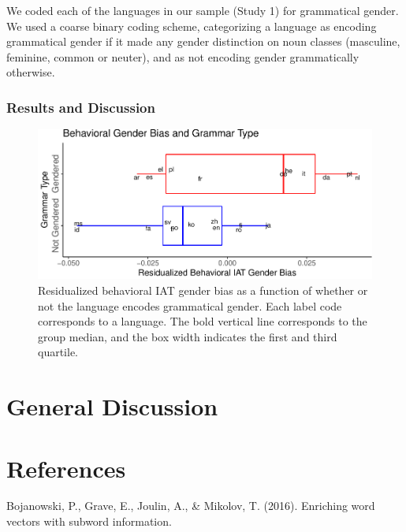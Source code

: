 \documentclass[man,floatsintext]{apa6}
\theoremstyle{definition}
\theoremstyle{definition}
\theoremstyle{definition}
\theoremstyle{remark}
\begin{document}
We coded each of the languages in our sample (Study 1) for grammatical
gender. We used a coarse binary coding scheme, categorizing a language
as encoding grammatical gender if it made any gender distinction on noun
classes (masculine, feminine, common or neuter), and as not encoding
gender grammatically otherwise.

\subsubsection{Results and Discussion}\label{results-and-discussion-1}

\begin{figure}
\centering
\includegraphics{iat_lang_files/figure-latex/unnamed-chunk-19-1.pdf}
\caption{\label{fig:unnamed-chunk-19}Residualized behavioral IAT gender bias
as a function of whether or not the language encodes grammatical gender.
Each label code corresponds to a language. The bold vertical line
corresponds to the group median, and the box width indicates the first
and third quartile.}
\end{figure}

\section{General Discussion}\label{general-discussion}

\newpage

\section{References}\label{references}

\begingroup
\setlength{\parindent}{-0.5in} \setlength{\leftskip}{0.5in}

\hypertarget{refs}{}
\hypertarget{ref-bojanowski2016enriching}{}
Bojanowski, P., Grave, E., Joulin, A., \& Mikolov, T. (2016). Enriching
word vectors with subword information.
\end{document}
